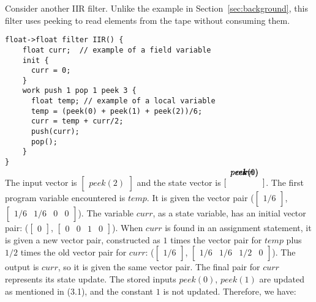 Consider another IIR filter.  Unlike the example in
Section~\ref{sec:background}, this filter uses peeking to read
elements from the tape without consuming them.

\begin{singlespace}
\vspace{-12pt}
\begin{scriptsize}
\begin{verbatim}
float->float filter IIR() {
    float curr;  // example of a field variable
    init {
      curr = 0;
    }
    work push 1 pop 1 peek 3 {
      float temp; // example of a local variable
      temp = (peek(0) + peek(1) + peek(2))/6;
      curr = temp + curr/2;
      push(curr);
      pop();
    }
}
\end{verbatim}
\end{scriptsize}
\vspace{-36pt}
\end{singlespace}
    The input vector is $\left [ \begin{array} {c} peek(2) \end{array}
\right ]$ and the state vector is $\left [ \begin{array} {c} \vspace{-36pt} \\ \vspace{-12pt} peek(0) \\ \vspace{-12pt}
peek(1) \\ \vspace{-12pt} curr \\ \vspace{-12pt} 1 \vspace{12pt} \end{array} \right ]$. The first program
variable encountered is $temp$. It is given the vector pair
($\left [ \begin{array} {c} 1/6 \end{array} \right ]$, $\left [
\begin{array} {cccc} 1/6 & 1/6 & 0 & 0 \end{array} \right ]$). The
variable $curr$, as a state variable, has an initial vector pair:
($\left [ \begin{array} {c} 0 \end{array} \right ]$, $\left
[\begin{array} {cccc} 0 & 0 & 1 & 0
\end{array} \right ]$). When $curr$ is found in an assignment
statement, it is given a new vector pair, constructed as $1$ times
the vector pair for $temp$ plus $1/2$ times the old vector pair
for $curr$: ($\left [ \begin{array} {c} 1/6 \end{array} \right ]$,
$\left [ \begin{array} {cccc} 1/6 & 1/6 & 1/2 & 0 \end{array}
\right ]$). The output is $curr$, so it is given the same vector
pair. The final pair for $curr$ represents its state update. The
stored inputs $peek(0)$, $peek(1)$ are updated as mentioned in
(3.1), and the constant $1$ is not updated. Therefore, we have:

